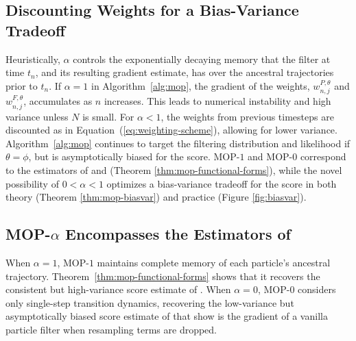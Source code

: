 \documentclass[numsec,webpdf,modern,medium,namedate]{oup-authoring-template}
\theoremstyle{thmstyleone}%
\theoremstyle{thmstyletwo}%
\theoremstyle{thmstylethree}%
\begin{document}
\subsection{Discounting Weights for a Bias-Variance Tradeoff}

Heuristically, $\alpha$ controls the exponentially decaying memory that the filter at time $t_n$, and its resulting gradient estimate, has over the ancestral trajectories prior to $t_n$. If $\alpha=1$ in Algorithm~\ref{alg:mop}, the gradient of the weights, $w^{P,\theta}_{n,j}$ and $w^{F,\theta}_{n,j}$, accumulates as $n$ increases.
This leads to numerical instability and high variance unless $N$ is small.
For $\alpha<1$, the weights from previous timesteps are discounted as in Equation~(\ref{eq:weighting-scheme}), allowing for lower variance. Algorithm~\ref{alg:mop} continues to target the filtering distribution and likelihood if $\theta=\phi$, but is asymptotically biased for the score.
MOP-$1$ and MOP-$0$ correspond to the estimators of \cite{poyiadjis11} and \cite{naesseth18} (Theorem \ref{thm:mop-functional-forms}), while the novel possibility of $0<\alpha<1$ optimizes a bias-variance tradeoff for the score in both theory (Theorem \ref{thm:mop-biasvar}) and practice (Figure \ref{fig:biasvar}). 



\subsection{MOP-$\alpha$ Encompasses the Estimators of \citep{poyiadjis11, naesseth18}}

When $\alpha=1$, MOP-$1$ maintains complete memory of each particle's ancestral trajectory. Theorem~\ref{thm:mop-functional-forms} shows that it recovers the consistent but high-variance score estimate of \cite{poyiadjis11}. 
When $\alpha=0$, MOP-$0$ considers only single-step transition dynamics, recovering the low-variance but asymptotically biased score estimate of \cite{naesseth18} that \cite{scibior21} show is the gradient of a vanilla particle filter when resampling terms are dropped. 
\end{document}
